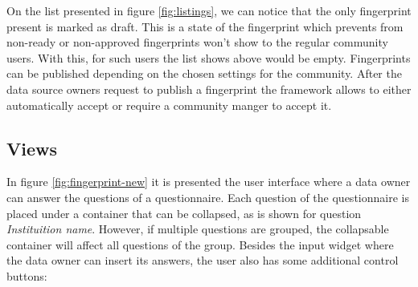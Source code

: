 On the list presented in figure \ref{fig:listings}, we can notice that the only fingerprint present is marked as draft.
This is a state of the fingerprint which prevents from non-ready or non-approved fingerprints won't show to the regular community users.
With this, for such users the list shows above would be empty.
Fingerprints can be published depending on the chosen settings for the community.
After the data source owners request to publish a fingerprint the framework allows to either automatically accept or require a community manger to accept it.

\subsection*{Views}

In figure \ref{fig:fingerprint-new} it is presented the user interface where a data owner can answer the questions of a questionnaire.
Each question of the questionnaire is placed under a container that can be collapsed, as is shown for question \textit{Instituition name}.
However, if multiple questions are grouped, the collapsable container will affect all questions of the group.
Besides the input widget where the data owner can insert its answers, the user also has some additional control buttons:


